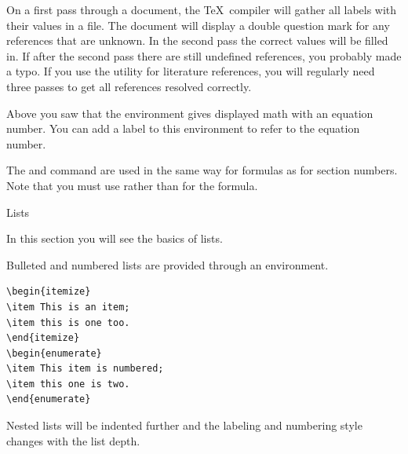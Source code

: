 {On a first pass through a document, the \TeX\ compiler will gather
  all labels with their values in a  file. The document will
  display a double question mark for any references that are
  unknown. In the second pass the correct values will be filled
  in.}
{If after the second pass there are still undefined references, you
  probably made a typo. If you use the  utility for
  literature references, you will regularly need three passes to get
  all references resolved correctly.}

Above you saw that the  environment gives displayed
math with an equation number. You can add a label to this environment
to refer to the equation number.

{The \n{\\label} and \n{\\ref} command are used in the same way for
  formulas as for section numbers. Note that you must use
   rather than \n{\\[...\\]} for the formula.}{}

 {Lists}

\begin{purpose}
  In this section you will see the basics of lists.
\end{purpose}

Bulleted and numbered lists are provided through an environment.
\begin{verbatim}
\begin{itemize}
\item This is an item;
\item this is one too.
\end{itemize}
\begin{enumerate}
\item This item is numbered;
\item this one is two.
\end{enumerate}
\end{verbatim}

{Nested lists will be indented further and the labeling and numbering
  style changes with the list depth.}{}

